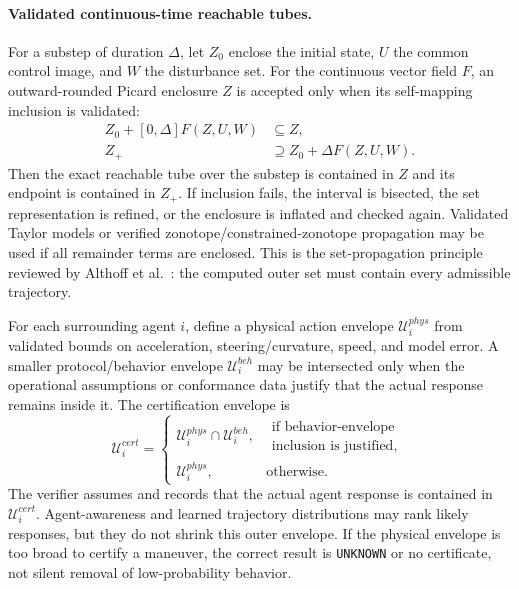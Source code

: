\documentclass[letterpaper]{article} %
\begin{document}
\paragraph{Validated continuous-time reachable tubes.}
For a substep of duration $\Delta$, let $Z_0$ enclose the initial state, $U$ the common control image, and $W$ the disturbance set. For the continuous vector field $F$, an outward-rounded Picard enclosure $Z$ is accepted only when its self-mapping inclusion is validated:
\begin{equation}
\begin{aligned}
Z_0+[0,\Delta]F(Z,U,W)&\subseteq Z,\\
Z_+&\supseteq Z_0+\Delta F(Z,U,W).
\end{aligned}
\label{eq:picard-tube}
\end{equation}
Then the exact reachable tube over the substep is contained in $Z$ and its endpoint is contained in $Z_+$. If inclusion fails, the interval is bisected, the set representation is refined, or the enclosure is inflated and checked again. Validated Taylor models or verified zonotope/constrained-zonotope propagation may be used if all remainder terms are enclosed. This is the set-propagation principle reviewed by Althoff et al.~\citep{althoff2021set}: the computed outer set must contain every admissible trajectory.

For each surrounding agent $i$, define a physical action envelope $\mathcal U_i^{phys}$ from validated bounds on acceleration, steering/curvature, speed, and model error. A smaller protocol/behavior envelope $\mathcal U_i^{beh}$ may be intersected only when the operational assumptions or conformance data justify that the actual response remains inside it. The certification envelope is
\begin{equation}
\mathcal U_i^{cert}=
\begin{cases}
\mathcal U_i^{phys}\cap\mathcal U_i^{beh},
&\begin{gathered}
\text{if behavior-envelope}\\[-2pt]
\text{inclusion is justified},
\end{gathered}\\
\mathcal U_i^{phys},&\text{otherwise}.
\end{cases}
\label{eq:agent-envelope}
\end{equation}
The verifier assumes and records that the actual agent response is contained in $\mathcal U_i^{cert}$. Agent-awareness and learned trajectory distributions may rank likely responses, but they do not shrink this outer envelope. If the physical envelope is too broad to certify a maneuver, the correct result is \texttt{UNKNOWN} or no certificate, not silent removal of low-probability behavior.
\end{document}
